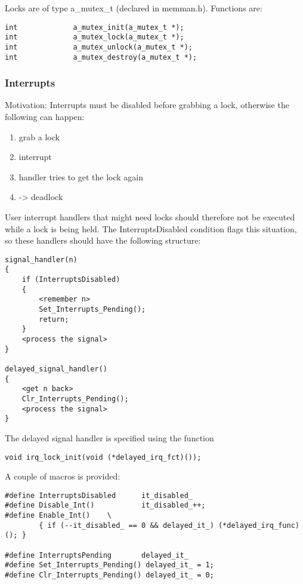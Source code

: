 Locks are of type a_mutex_t (declared in memman.h).
Functions are:

\begin{verbatim}
int             a_mutex_init(a_mutex_t *);
int             a_mutex_lock(a_mutex_t *);
int             a_mutex_unlock(a_mutex_t *);
int             a_mutex_destroy(a_mutex_t *);
\end{verbatim}


\subsubsection{Interrupts}

Motivation: Interrupts must be disabled before grabbing a lock,
otherwise the following can happen:
\begin{enumerate}
   \item grab a lock
   \item interrupt
   \item handler tries to get the lock again
   \item -> deadlock
\end{enumerate}

User interrupt handlers that might need locks should therefore
not be executed while a lock is being held.
The InterruptsDisabled condition flags this situation,
so these handlers should have the following structure:

\begin{verbatim}
signal_handler(n)
{
    if (InterruptsDisabled)
    {
        <remember n>
        Set_Interrupts_Pending();
        return;
    }
    <process the signal>
}

delayed_signal_handler()
{
    <get n back>
    Clr_Interrupts_Pending();
    <process the signal>
}
\end{verbatim}


The delayed signal handler is specified using the function

\begin{verbatim}
void irq_lock_init(void (*delayed_irq_fct)());
\end{verbatim}


A couple of macros is provided:

\begin{verbatim}
#define InterruptsDisabled      it_disabled_
#define Disable_Int()           it_disabled_++;
#define Enable_Int()    \
        { if (--it_disabled_ == 0 && delayed_it_) (*delayed_irq_func)(); }

#define InterruptsPending       delayed_it_
#define Set_Interrupts_Pending() delayed_it_ = 1;
#define Clr_Interrupts_Pending() delayed_it_ = 0;
\end{verbatim}

